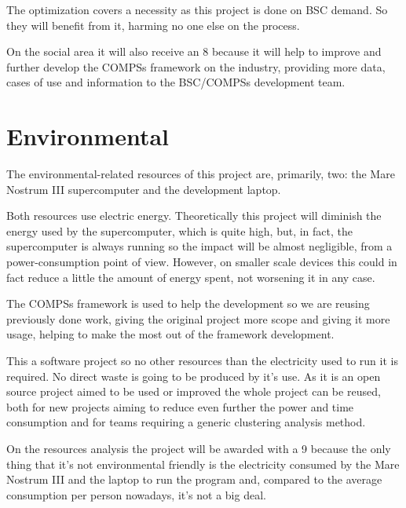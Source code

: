 The optimization covers a necessity as this project is done on BSC demand. So they will benefit from it, harming no one else on the process.

On the social area it will also receive an 8 because it will help to improve and further develop the COMPSs framework on the industry, providing more data, cases of use and information to the BSC/COMPSs development team.

\section{Environmental}

The environmental-related resources of this project are, primarily, two: the Mare Nostrum III supercomputer and the development laptop. 

Both resources use electric energy. Theoretically this project will diminish the energy used by the supercomputer, which is quite high, but, in fact, the supercomputer is always running so the impact will be almost negligible, from a power-consumption point of view. However, on smaller scale devices this could in fact reduce a little the amount of energy spent, not worsening it in any case.

The COMPSs framework is used to help the development so we are reusing previously done work, giving the original project more scope and giving it more usage, helping to make the most out of the framework development.

This a software project so no other resources than the electricity used to run it is required. No direct waste is going to be produced by it's use. As it is an open source project aimed to be used or improved the whole project can be reused, both for new projects aiming to reduce even further the power and time consumption and for teams requiring a generic clustering analysis method.

On the resources analysis the project will be awarded with a 9 because the only thing that it's not environmental friendly is the electricity consumed by the Mare Nostrum III and the laptop to run the program and, compared to the average consumption per person nowadays, it's not a big deal.